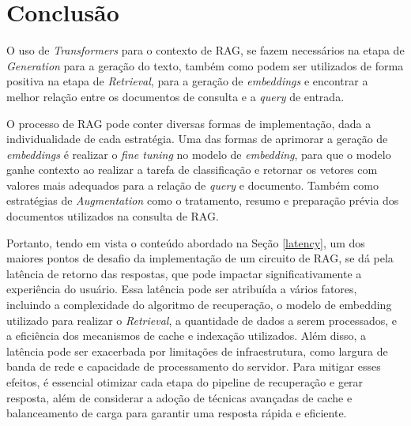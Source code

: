 \newpage
\clearpage
\section{Conclusão}

O uso de \textit{Transformers} para o contexto de RAG, se fazem necessários na etapa de \textit{Generation} para a geração do texto, também como podem ser utilizados de forma positiva na etapa de \textit{Retrieval}, para a geração de \textit{embeddings} e encontrar a melhor relação entre os documentos de consulta e a \textit{query} de entrada.

O processo de RAG pode conter diversas formas de implementação, dada a individualidade de cada estratégia. Uma das formas de aprimorar a geração de \textit{embeddings} é realizar o \textit{fine tuning} no modelo de \textit{embedding}, para que o modelo ganhe contexto ao realizar a tarefa de classificação e retornar os vetores com valores mais adequados para a relação de \textit{query} e documento. Também como estratégias de \textit{Augmentation} como o tratamento, resumo e preparação prévia dos documentos utilizados na consulta de RAG.

Portanto, tendo em vista o conteúdo abordado na Seção \ref{latency}, um dos maiores pontos de desafio da implementação de um circuito de RAG, se dá pela latência de retorno das respostas, que pode impactar significativamente a experiência do usuário. Essa latência pode ser atribuída a vários fatores, incluindo a complexidade do algoritmo de recuperação, o modelo de embedding utilizado para realizar o \textit{Retrieval}, a quantidade de dados a serem processados, e a eficiência dos mecanismos de cache e indexação utilizados. Além disso, a latência pode ser exacerbada por limitações de infraestrutura, como largura de banda de rede e capacidade de processamento do servidor. Para mitigar esses efeitos, é essencial otimizar cada etapa do pipeline de recuperação e gerar resposta, além de considerar a adoção de técnicas avançadas de cache e balanceamento de carga para garantir uma resposta rápida e eficiente.
